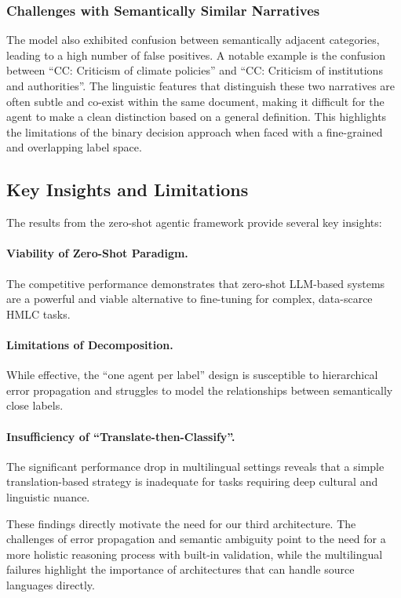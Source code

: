 \subsubsection{Challenges with Semantically Similar Narratives}

The model also exhibited confusion between semantically adjacent categories, leading to a high number of false positives. A notable example is the confusion between ``CC: Criticism of climate policies'' and ``CC: Criticism of institutions and authorities''. The linguistic features that distinguish these two narratives are often subtle and co-exist within the same document, making it difficult for the agent to make a clean distinction based on a general definition. This highlights the limitations of the binary decision approach when faced with a fine-grained and overlapping label space.

\subsection{Key Insights and Limitations}

The results from the zero-shot agentic framework provide several key insights:

\paragraph{Viability of Zero-Shot Paradigm.} The competitive performance demonstrates that zero-shot LLM-based systems are a powerful and viable alternative to fine-tuning for complex, data-scarce HMLC tasks.

\paragraph{Limitations of Decomposition.} While effective, the ``one agent per label'' design is susceptible to hierarchical error propagation and struggles to model the relationships between semantically close labels.

\paragraph{Insufficiency of ``Translate-then-Classify''.} The significant performance drop in multilingual settings reveals that a simple translation-based strategy is inadequate for tasks requiring deep cultural and linguistic nuance.

These findings directly motivate the need for our third architecture. The challenges of error propagation and semantic ambiguity point to the need for a more holistic reasoning process with built-in validation, while the multilingual failures highlight the importance of architectures that can handle source languages directly.